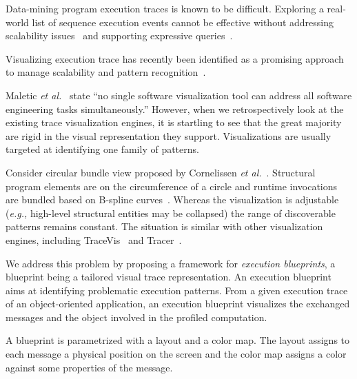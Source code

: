 \documentclass{sig-alternate}
\newcommand{\eg}{\emph{e.g.,}\xspace}
\newcommand{\etal}{\emph{et al.}\xspace}
\begin{document}

Data-mining program execution traces is known to be difficult. Exploring a real-world list of sequence execution events cannot be effective without addressing scalability issues~\cite{Kuhn06c} and supporting expressive queries~\cite{Zaid05a}. 

Visualizing execution trace has recently been identified as a promising approach to manage scalability and pattern recognition~\cite{Maoz11a,Zaid05a,Reis07a}. %

Maletic \etal~\cite{Male02a} state ``no single software visualization tool can address all software engineering tasks simultaneously.'' However, when we retrospectively look at the existing trace visualization engines, it is startling to see that the great majority are rigid in the visual representation they support. Visualizations are usually targeted at identifying one family of patterns.%

Consider circular bundle view proposed by Cornelissen \etal~\cite{Corn08a}. Structural program elements are on the circumference of a circle and runtime invocations are bundled based on B-spline curves~\cite{Holt06b}. Whereas the visualization is adjustable (\eg high-level structural entities may be collapsed) the range of discoverable patterns remains constant. The situation is similar with other visualization engines, including TraceVis~\cite{Deel07a} and Tracer~\cite{Maoz11a}.

 


We address this problem by proposing a framework for \emph{execution blueprints}, a blueprint being a tailored visual trace representation. An execution blueprint aims at identifying problematic execution patterns. From a given execution trace of an object-oriented application, an execution blueprint visualizes the exchanged messages and the object involved in the profiled computation.

A blueprint is parametrized with a layout and a color map. The layout assigns to each message a physical position on the screen and the color map assigns a color against some properties of the message.
\end{document}

